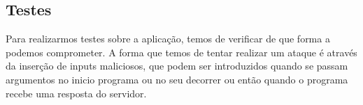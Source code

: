 \subsection{Testes}

\par Para realizarmos testes sobre a aplicação, temos de verificar de que forma a podemos comprometer. A forma que temos de tentar realizar um ataque é através da inserção de inputs maliciosos, que podem ser introduzidos quando se passam argumentos no inicio programa ou no seu decorrer ou então quando o programa recebe uma resposta do servidor.























